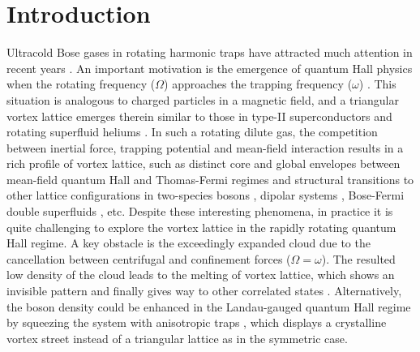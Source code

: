 \documentclass[reprint,aps,pra,twocolumn,superscriptaddress]{revtex4-1}
\begin{document}
\section{Introduction}
Ultracold Bose gases in rotating harmonic traps have attracted much attention in recent years  \cite{review1,review2}. An important motivation is the emergence of quantum Hall physics when the rotating frequency ($\Omega$) approaches the trapping frequency ($\omega$)  \cite{JasonHo, Cooper}. This situation is analogous to charged particles in a magnetic field, and a triangular vortex lattice emerges therein similar to  those  in type-II superconductors \cite{Abrikosov1957} and rotating superfluid heliums \cite{Tkachenko1966}. In such a rotating dilute gas, the competition between inertial force, trapping potential and mean-field interaction results in a rich profile of vortex lattice, such as distinct core and global envelopes between mean-field quantum Hall and Thomas-Fermi regimes \cite{Fischer2003,Baym2004} and structural transitions to other lattice configurations in two-species bosons \cite{Mueller_Ho2002,Ueda2003,Cornell2}, dipolar systems \cite{Cooper2,HuiZhai1,Kumar2017}, Bose-Fermi double superfluids \cite{HuiZhai2}, etc.  %
Despite these interesting phenomena, in practice it is quite  challenging  to explore the vortex lattice in the rapidly rotating quantum Hall regime. A key obstacle is the exceedingly expanded cloud due to the cancellation between centrifugal and confinement forces ($\Omega=\omega$). The resulted low density of the cloud leads  to the melting of vortex lattice, which shows an invisible pattern \cite{QH_expt1, QH_expt2} and finally gives way to other correlated states \cite{Cooper, Sinova2002:QuantumMeltingAbsence,Regnault2003:QuantumHallFractions}. Alternatively, the boson density could be enhanced in the Landau-gauged quantum Hall regime by %
squeezing the system with anisotropic traps \cite{MIT_expt1, MIT_expt2}, which  displays a crystalline vortex street \cite{Gora} instead of a triangular lattice as in the symmetric case. 
 
\end{document}
